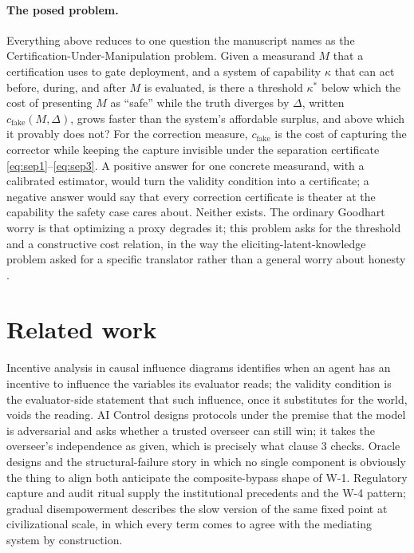 \documentclass[11pt]{article}
\theoremstyle{remark}
\newcommand{\cfake}{c_{\mathrm{fake}}}
\begin{document}
\paragraph{The posed problem.}
Everything above reduces to one question the manuscript names as the Certification-Under-Manipulation problem. Given a measurand $M$ that a certification uses to gate deployment, and a system of capability $\kappa$ that can act before, during, and after $M$ is evaluated, is there a threshold $\kappa^{*}$ below which the cost of presenting $M$ as ``safe'' while the truth diverges by $\Delta$, written $\cfake(M,\Delta)$, grows faster than the system's affordable surplus, and above which it provably does not? For the correction measure, $\cfake$ is the cost of capturing the corrector while keeping the capture invisible under the separation certificate \eqref{eq:sep1}--\eqref{eq:sep3}. A positive answer for one concrete measurand, with a calibrated estimator, would turn the validity condition into a certificate; a negative answer would say that every correction certificate is theater at the capability the safety case cares about. Neither exists. The ordinary Goodhart worry \parencite{goodhart1984problems,manheim2018goodhart} is that optimizing a proxy degrades it; this problem asks for the threshold and a constructive cost relation, in the way the eliciting-latent-knowledge problem asked for a specific translator rather than a general worry about honesty \parencite{christiano2021elk}.

\section{Related work}

Incentive analysis in causal influence diagrams \parencite{everitt2021agentincentives} identifies when an agent has an incentive to influence the variables its evaluator reads; the validity condition is the evaluator-side statement that such influence, once it substitutes for the world, voids the reading. AI Control \parencite{greenblatt2024aicontrol} designs protocols under the premise that the model is adversarial and asks whether a trusted overseer can still win; it takes the overseer's independence as given, which is precisely what clause 3 checks. Oracle designs \parencite{armstrong2010oracle} and the structural-failure story in which no single component is obviously the thing to align \parencite{christiano2019failure} both anticipate the composite-bypass shape of W-1. Regulatory capture \parencite{stigler1971theory,carpenter2010reputation} and audit ritual \parencite{power1997audit} supply the institutional precedents and the W-4 pattern; gradual disempowerment \parencite{kulveit2025gradualdisempowerment} describes the slow version of the same fixed point at civilizational scale, in which every term comes to agree with the mediating system by construction.
\end{document}
